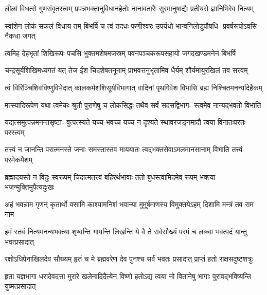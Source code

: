 \fourlineindentedshloka
{लीलां विधत्से गुणसंवृतस्त्वम्}
{प्रपन्नभक्तानुविधानहेतोः}
{नानावतारैः सुरमानुषाद्यैः}
{प्रतीयसे ज्ञानिभिरेव नित्यम्} %

\fourlineindentedshloka
{स्वांशेन लोकं सकलं विधाय तम्}
{बिभर्षि च त्वं तदधः फणीश्वरः}
{उपर्यधो भान्वनिलोडुपौषधि-}
{प्रवर्षरूपोऽवसि नैकधा जगत्} %

\fourlineindentedshloka
{त्वमिह देहभृतां शिखिरूपः}
{पचसि भुक्तमशेषमजस्रम्}
{पवनपञ्चकरूपसहायो}
{जगदखण्डमनेन बिभर्षि} %

\fourlineindentedshloka
{चन्द्रसूर्यशिखिमध्यगतं यत्}
{तेज ईश चिदशेषतनूनाम्}
{प्राभवत्तनुभृतामिव धैर्यम्}
{शौर्यमायुरखिलं तव सत्त्वम्} %

\fourlineindentedshloka
{त्वं विरिञ्चिशिवविष्णुविभेदात्}
{कालकर्मशशिसूर्यविभागात्}
{वादिनां पृथगिवेश विभासि}
{ब्रह्म निश्चितमनन्यदिहैकम्} %

\fourlineindentedshloka
{मत्स्यादिरूपेण यथा त्वमेकः}
{श्रुतौ पुराणेषु च लोकसिद्धः}
{तथैव सर्वं सदसद्विभाग-}
{स्त्वमेव नान्यद्भवतो विभाति} %

\fourlineindentedshloka
{यद्यत्समुत्पन्नमनन्तसृष्टा-}
{वुत्पत्स्यते यच्च भवच्च यच्च}
{न दृश्यते स्थावरजङ्गमादौ}
{त्वया विनातःपरतः परस्त्वम्} %

\fourlineindentedshloka
{तत्त्वं न जानन्ति परात्मनस्ते}
{जनाः समस्तास्तव माययातः}
{त्वद्भक्तसेवाऽमलमानसानाम्}
{विभाति तत्त्वं परमेकमैशम्} %

\fourlineindentedshloka
{ब्रह्मादयस्ते न विदुः स्वरूपम्}
{चिदात्मतत्त्वं बहिरर्थभावाः}
{ततो बुधस्त्वामिदमेव रूपम्}
{भक्त्या भजन्मुक्तिमुपैत्यदुःखः} %

\fourlineindentedshloka
{अहं भवन्नाम गृणन् कृतार्थो}
{वसामि काश्यामनिशं भवान्या}
{मुमूर्षमाणस्य विमुक्तयेऽहम्}
{दिशामि मन्त्रं तव राम नाम} %

\fourlineindentedshloka
{इमं स्तवं नित्यमनन्यभक्त्या}
{शृण्वन्ति गायन्ति लिखन्ति ये वै}
{ते सर्वसौख्यं परमं च लब्ध्वा}
{भवत्पदं यान्तु भवत्प्रसादात्} %

\begin{minipage}{\linewidth}
\centering
{}

\fourlineindentedshloka
{रक्षोऽधिपेनाखिलदेव सौख्यम्}
{हृतं च मे ब्रह्मवरेण देव}
{पुनश्च सर्वं भवतः प्रसादात्}
{प्राप्तं हतो राक्षसदुष्टशत्रुः} %
\end{minipage}

\begin{minipage}{\linewidth}
\centering
{}

\fourlineindentedshloka
{हृता यज्ञभागा धरादेवदत्ता}
{मुरारे खलेनादिदैत्येन विष्णो}
{हतोऽद्य त्वया नो वितानेषु भागाः}
{पुरावद्भविष्यन्ति युष्मत्प्रसादात्} %
\end{minipage}

